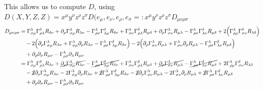 \documentclass[a4paper,11pt]{article}
\numberwithin{equation}{section}
\theoremstyle{definition}
\begin{document}
This allows us to compute $D$, using $D(X,Y,Z,Z)=x^\mu y^\nu z^\rho z^\sigma D(e_\mu, e_\nu, e_\rho, e_\sigma =: x^\mu y^\nu z^\rho z^\sigma D_{\mu\nu\rho\sigma}$
\begin{align*}
D_{\mu\nu\rho\sigma} &= \Gamma_{\sigma\mu}^\lambda\Gamma_{\rho\lambda}^\delta R_{\delta\nu}
    + \partial_\rho\Gamma_{\sigma\mu}^\lambda R_{\lambda\nu}
    - \Gamma_{\rho\sigma}^\lambda \Gamma_{\lambda\mu}^\delta R_{\delta\nu}
    + \Gamma_{\sigma\nu}^\lambda \Gamma_{\rho\lambda}^\delta R_{\mu\delta}
    + \partial_\rho  \Gamma_{\sigma\nu}^\lambda R_{\mu\lambda}
    - \Gamma_{\rho\sigma}^\lambda \Gamma_{\lambda\nu}^\delta R_{\mu\delta}
    + 2 \Big(\Gamma_{\rho\mu}^\lambda\Gamma_{\sigma\nu}^\delta R_{\lambda\delta}\Big)\\
    &\quad -2\Big( \partial_\rho \Gamma_{\sigma\mu}^\lambda R_{\lambda\nu} + \Gamma_{\sigma\mu}^\lambda \partial_\rho R_{\lambda\nu} - \Gamma_{\rho\sigma}^\lambda \Gamma_{\lambda\mu}^\delta R_{\delta\nu}\Big)
    -2 \Big(\partial_\rho \Gamma_{\sigma\nu}^\lambda R_{\mu\lambda}
    + \Gamma_{\sigma\nu}^\lambda \partial_\rho R_{\mu\lambda}
    - \Gamma_{\rho\sigma}^\lambda \Gamma_{\lambda\nu}^\delta R_{\mu\delta}\Big)\\
    &\quad  + \partial_\rho\partial_\sigma R_{\mu\nu}
    - \Gamma_{\rho\sigma}^\lambda \partial_\lambda R_{\mu\nu}\\
    &= \Gamma_{\sigma\mu}^\lambda\Gamma_{\rho\lambda}^\delta R_{\delta\nu}
    + \cancel{\partial_\rho\Gamma_{\sigma\mu}^\lambda R_{\lambda\nu}}
    - \cancel{\Gamma_{\rho\sigma}^\lambda \Gamma_{\lambda\mu}^\delta R_{\delta\nu}}
    + \Gamma_{\sigma\nu}^\lambda \Gamma_{\rho\lambda}^\delta R_{\mu\delta}
    + \cancel{\partial_\rho  \Gamma_{\sigma\nu}^\lambda R_{\mu\lambda}}
    - \cancel{\Gamma_{\rho\sigma}^\lambda \Gamma_{\lambda\nu}^\delta R_{\mu\delta}}
    + 2 \Gamma_{\rho\mu}^\lambda\Gamma_{\sigma\nu}^\delta R_{\lambda\delta}\\
    &\quad -\cancel{2} \partial_\rho \Gamma_{\sigma\mu}^\lambda R_{\lambda\nu}
    -2 \Gamma_{\sigma\mu}^\lambda \partial_\rho R_{\lambda\nu}
    +\cancel{2} \Gamma_{\rho\sigma}^\lambda \Gamma_{\lambda\mu}^\delta R_{\delta\nu}
    -\cancel{2} \partial_\rho \Gamma_{\sigma\nu}^\lambda R_{\mu\lambda}
    -2 \Gamma_{\sigma\nu}^\lambda \partial_\rho R_{\mu\lambda}
    +\cancel{2} \Gamma_{\rho\sigma}^\lambda \Gamma_{\lambda\nu}^\delta R_{\mu\delta}\\
    &\quad  + \partial_\rho\partial_\sigma R_{\mu\nu}
    - \Gamma_{\rho\sigma}^\lambda \partial_\lambda R_{\mu\nu}\\

\end{align*}
\end{document}
